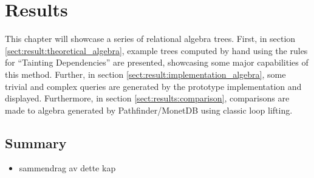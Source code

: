 \chapter{Results}
\label{chapter:results}
This chapter will showcase a series of relational algebra trees. First, in
section \ref{sect:result:theoretical_algebra}, example trees computed by hand
using the rules for ``Tainting Dependencies'' are presented, showcasing
some major capabilities of this method. Further, in section
\ref{sect:result:implementation_algebra}, some trivial and complex queries are
generated by the prototype implementation and displayed. Furthermore, in
section \ref{sect:results:comparison}, comparisons are made to algebra
generated by Pathfinder/MonetDB using classic loop lifting.




\section{Summary}
\label{sect:res:summary}
\begin{itemize}
  \item sammendrag av dette kap
\end{itemize}
